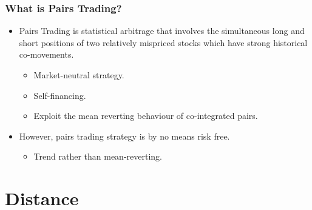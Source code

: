 \documentclass[pdf,9pt,xcolor=dvipsnames,hide notes]{beamer}
\begin{document}
	\begin{frame}[label=frame1]
		\frametitle{What is Pairs Trading?}
		
			
		\begin{itemize}
			\justifying
			
			
			\item Pairs Trading is statistical arbitrage that involves the simultaneous long and short positions of two relatively mispriced stocks which have strong historical co-movements.
			
			\pause
			
			\vspace{0.1cm}
			
			\begin{itemize}
				\setlength\itemsep{1em}
			\item Market-neutral strategy.
			\pause
			\item Self-financing. 
			\pause
			\item Exploit the mean reverting behaviour of co-integrated pairs.
			
		\end{itemize}
			
			
			\vspace{0.3cm}
			
			\pause 
			\item However, pairs trading strategy is by no means risk free. 
				\begin{itemize}
					\item Trend rather than mean-reverting.
				\end{itemize}
			
		\end{itemize}
	\end{frame}

	\section{Distance}
\end{document}
